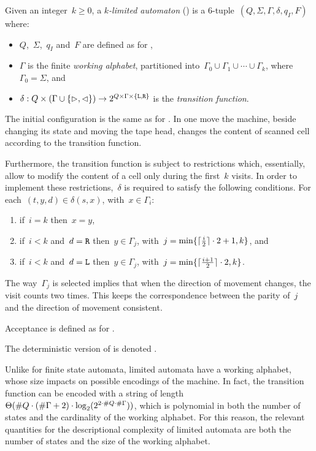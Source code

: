 \begin{defn}\label{def:kla}
	Given an integer~$k\ge0$, a \emph{$k$-limited automaton} (\kLA) is a 6-tuple~$(Q,\Sigma,\Gamma,\delta,q_I,F)$ where:
	\begin{itemize}
		\item $Q$,~$\Sigma$,~$q_I$ and~$F$ are defined as for \TNFAs,
		\item $\Gamma$ is the finite \emph{working alphabet}, partitioned into~$\Gamma_0\cup\Gamma_1\cup\cdots\cup\Gamma_k$, where~$\Gamma_0=\Sigma$, and
		\item $\delta:Q\times(\Gamma\cup\{\rhd,\lhd\})\to2^{Q\times\Gamma\times\{\mathtt L,\mathtt R\}}$ is the \emph{transition function}.
	\end{itemize}
	The initial configuration is the same as for \TNFAs.
	In one move the machine, beside changing its state and moving the tape head, changes the content of scanned cell according to the transition function.

	Furthermore, the transition function is subject to restrictions which, essentially, allow to modify the content of a cell only during the first~$k$ visits.
	In order to implement these restrictions,~$\delta$ is required to satisfy the following conditions. For each~$(t,y,d)\in\delta(s,x)$, with~$x\in\Gamma_i$:
	\begin{enumerate}[(1)]
		\item if~$i=k$ then~$x=y$,
		\item if~$i<k$ and~$d=\mathtt R$ then~$y\in\Gamma_j$, with~$j=\min\{\lceil \frac{i}{2} \rceil\cdot 2+1,k\}$, and
		\item if~$i<k$ and~$d=\mathtt L$ then~$y\in\Gamma_j$, with~$j=\min\{\lceil \frac{i+1}{2} \rceil\cdot 2,k\}$.
	\end{enumerate}
	The way~$\Gamma_j$ is selected implies that when the direction of movement changes, the visit counts two times.
	This keeps the correspondence between the parity of~$j$ and the direction of movement consistent.

	\noindent Acceptance is defined as for \TNFAs.

	\noindent The deterministic version of \kLAs is denoted \kDLAs.
\end{defn}

Unlike for finite state automata, limited automata have a working alphabet, whose size impacts on possible encodings of the machine.
In fact, the transition function can be encoded with a string of length~$\Theta(\# Q\cdot(\# \Gamma+2)\cdot\log_2(2^{2\cdot\# Q\cdot\# \Gamma}))$, which is polynomial in both the number of states and the cardinality of the working alphabet.
For this reason, the relevant quantities for the descriptional complexity of limited automata are both the number of states and the size of the working alphabet.


